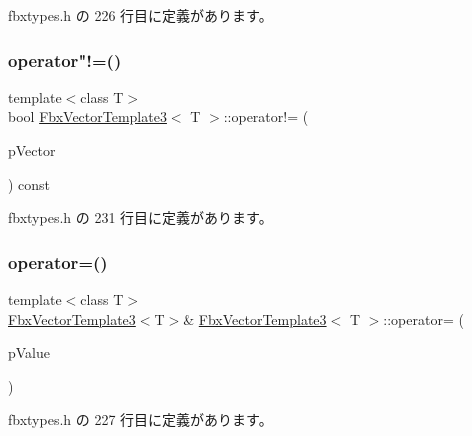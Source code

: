  fbxtypes.\+h の 226 行目に定義があります。

\mbox{\label{class_fbx_vector_template3_acf6fb2023f555ec2912566031918aa31}} 
\subsubsection{\texorpdfstring{operator"!=()}{operator!=()}}
{\footnotesize\ttfamily template$<$class T$>$ \\
bool \hyperlink{class_fbx_vector_template3}{Fbx\+Vector\+Template3}$<$ T $>$\+::operator!= (\begin{DoxyParamCaption}\item[{const \hyperlink{class_fbx_vector_template3}{Fbx\+Vector\+Template3}$<$ T $>$ \&}]{p\+Vector }\end{DoxyParamCaption}) const\hspace{0.3cm}{\ttfamily [inline]}}



 fbxtypes.\+h の 231 行目に定義があります。

\mbox{\label{class_fbx_vector_template3_aed9997cebee8c4bfeef05b433de743ec}} 
\subsubsection{\texorpdfstring{operator=()}{operator=()}\hspace{0.1cm}{\footnotesize\ttfamily [1/3]}}
{\footnotesize\ttfamily template$<$class T$>$ \\
\hyperlink{class_fbx_vector_template3}{Fbx\+Vector\+Template3}$<$T$>$\& \hyperlink{class_fbx_vector_template3}{Fbx\+Vector\+Template3}$<$ T $>$\+::operator= (\begin{DoxyParamCaption}\item[{T const \&}]{p\+Value }\end{DoxyParamCaption})\hspace{0.3cm}{\ttfamily [inline]}}



 fbxtypes.\+h の 227 行目に定義があります。

